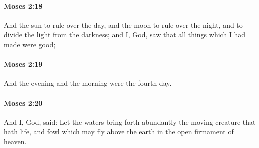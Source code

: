 		\paragraph{Moses 2:18} %
			\label{MOSES-2-18}

			And the sun to rule over the day, and the moon to rule over the night, and to divide the light from the darkness; and I, God, saw that all things which I had made were good;


		\paragraph{Moses 2:19} %
			\label{MOSES-2-19}

			And the evening and the morning were the fourth day.


		\paragraph{Moses 2:20} %
			\label{MOSES-2-20}

			And I, God, said: Let the waters bring forth abundantly the moving creature that hath life, and fowl which may fly above the earth in the open firmament of heaven.


